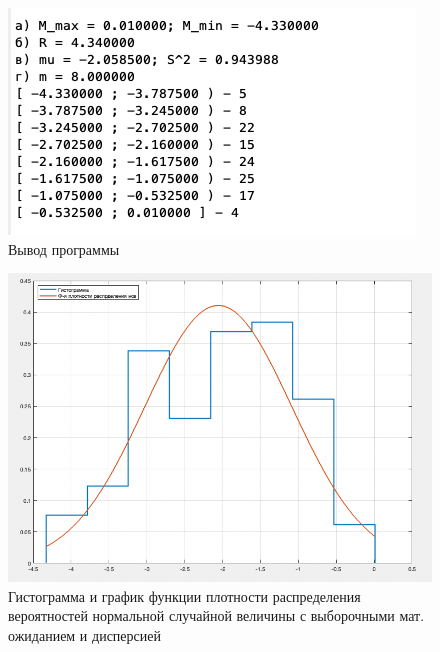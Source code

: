 \documentclass[12pt]{report}
\begin{document}
\begin{figure}[H]
	\centering
	\includegraphics[scale=0.6]{img/res.png}
	\caption{Вывод программы}
	\label{fig:12}
\end{figure}


\begin{figure}[H]
	\centering
	\includegraphics[scale=0.6]{img/1.png}
	\caption{Гистограмма и график функции плотности распределения вероятностей нормальной случайной величины с выборочными мат. ожиданием и дисперсией}
	\label{fig:1}
\end{figure}
\end{document}
